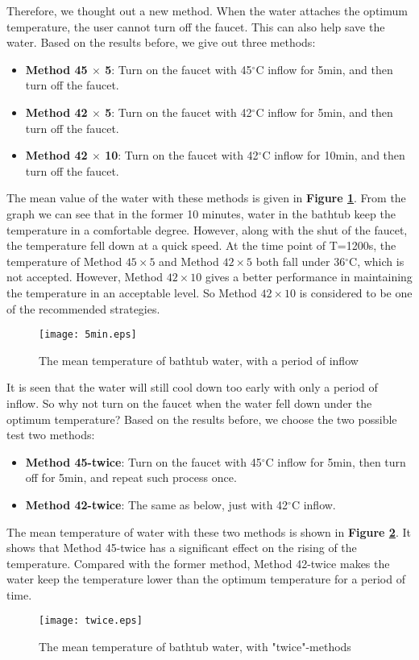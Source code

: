 \documentclass[12pt]{article}
\begin{document}
Therefore, we thought out a new method. When the water attaches the optimum temperature, the user
cannot turn off the faucet. This can also help save the water. Based on the results before, we give
out three methods:
\begin{itemize}
    \item \textbf{Method 45 $\times$ 5}: Turn on the faucet with 45$^\circ$C inflow for 5min, and then
    turn off the faucet.
    \item \textbf{Method 42 $\times$ 5}: Turn on the faucet with 42$^\circ$C inflow for 5min, and then
    turn off the faucet.
    \item \textbf{Method 42 $\times$ 10}: Turn on the faucet with 42$^\circ$C inflow for 10min, and
    then turn off the faucet.
\end{itemize}

The mean value of the water with these methods is given in \textbf{Figure \ref{5m}}. From the graph
we can see that in the former 10 minutes, water in the bathtub keep the temperature in a comfortable
degree. However, along with the shut of the faucet, the temperature fell down at a quick speed. At
the time point of T=1200s, the temperature of Method $45\times5$ and Method $42\times5$ both fall
under 36$^\circ$C, which is not accepted. However, Method $42\times10$ gives a better performance in
maintaining the temperature in an acceptable level. So Method $42\times10$ is considered to be one
of the recommended strategies.
\begin{figure}[!htbp]
\small
\centering
\texttt{[image: 5min.eps]}
\caption{The mean temperature of bathtub water, with a period of inflow}\label{5m}
\end{figure}

It is seen that the water will still cool down too early with only a period of inflow. So why not
turn on the faucet when the water fell down under the optimum temperature? Based on the results
before, we choose the two possible test two methods:
\begin{itemize}
    \item \textbf{Method 45-twice}: Turn on the faucet with 45$^\circ$C inflow for 5min, then turn
    off for 5min, and repeat such process once.
    \item \textbf{Method 42-twice}: The same as below, just with 42$^\circ$C inflow.
\end{itemize}

The mean temperature of water with these two methods is shown in \textbf{Figure \ref{ts}}. It shows
that Method 45-twice has a significant effect on the rising of the temperature. Compared with the
former method, Method 42-twice makes the water keep the temperature lower than the optimum
temperature for a period of time.
\begin{figure}[!htbp]
    \small
    \centering
    \texttt{[image: twice.eps]}
    \caption{The mean temperature of bathtub water, with "twice"-methods}\label{ts}
\end{figure}
\end{document}
